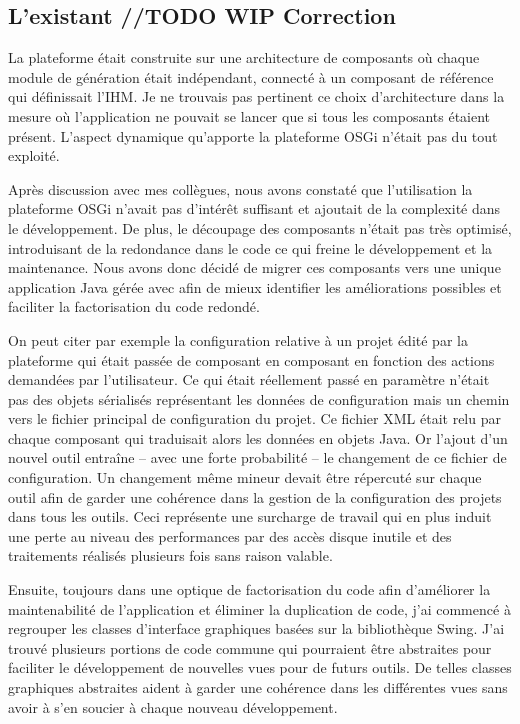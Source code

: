 \subsection{L'existant //TODO WIP Correction}
La plateforme était construite sur une architecture de composants 
où chaque module de génération était indépendant, connecté à un composant de
référence qui définissait l'IHM. Je ne trouvais pas pertinent ce choix
d'architecture dans la mesure où l'application ne pouvait se lancer que si tous
les composants étaient présent. L'aspect dynamique qu'apporte la plateforme
OSGi n'était pas du tout exploité.

Après discussion avec mes collègues, nous avons constaté que l'utilisation la
plateforme OSGi n'avait pas d'intérêt suffisant et ajoutait de la complexité
dans le développement. De plus, le découpage des composants n'était pas très
optimisé, introduisant de la redondance dans le code ce qui freine le
développement et la maintenance. Nous avons donc décidé de migrer ces composants
vers une unique application Java gérée avec  afin de mieux
identifier les améliorations possibles et faciliter la factorisation du code
redondé.

On peut citer par exemple la configuration relative à un projet édité par la
plateforme qui était passée de composant en composant en fonction des actions
demandées par l'utilisateur. Ce qui était réellement passé en paramètre n'était
pas des objets sérialisés représentant les données de configuration mais un
chemin vers le fichier principal de configuration du projet. Ce fichier XML
était relu par chaque composant qui traduisait alors les données en objets Java.
Or l'ajout d'un nouvel outil entraîne -- avec une forte probabilité -- le
changement de ce fichier de configuration. Un changement même mineur devait être
répercuté sur chaque outil afin de garder une cohérence dans la gestion de la
configuration des projets dans tous les outils. Ceci représente une surcharge de
travail qui en plus induit une perte au niveau des performances par des accès
disque inutile et des traitements réalisés plusieurs fois sans raison valable.

Ensuite, toujours dans une optique de factorisation du code afin d'améliorer la
maintenabilité de l'application et éliminer la duplication de code, j'ai
commencé à regrouper les classes d'interface graphiques basées sur la
bibliothèque Swing. J'ai trouvé plusieurs portions de code commune qui
pourraient être abstraites pour faciliter le développement de nouvelles vues
pour de futurs outils. De telles classes graphiques abstraites aident à garder une
cohérence dans les différentes vues sans avoir à s'en soucier à chaque nouveau
développement.

